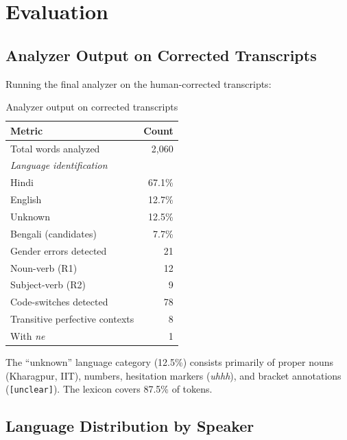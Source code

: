 \documentclass[11pt,a4paper]{report}
\begin{document}
\chapter{Evaluation}
\label{sec:eval}

\section{Analyzer Output on Corrected Transcripts}

Running the final analyzer on the human-corrected transcripts:

\begin{table}[H]
\centering
\caption{Analyzer output on corrected transcripts}
\label{tab:eval}
\begin{tabular}{lr}
\toprule
\textbf{Metric} & \textbf{Count} \\
\midrule
Total words analyzed & 2,060 \\
\midrule
\multicolumn{2}{l}{\textit{Language identification}} \\
\quad Hindi & 67.1\% \\
\quad English & 12.7\% \\
\quad Unknown & 12.5\% \\
\quad Bengali (candidates) & 7.7\% \\
\midrule
Gender errors detected & 21 \\
\quad Noun-verb (R1) & 12 \\
\quad Subject-verb (R2) & 9 \\
\midrule
Code-switches detected & 78 \\
\midrule
Transitive perfective contexts & 8 \\
\quad With \textit{ne} & 1 \\
\bottomrule
\end{tabular}
\end{table}

The ``unknown'' language category (12.5\%) consists primarily of proper nouns (Kharagpur, IIT), numbers, hesitation markers (\textit{uhhh}), and bracket annotations (\texttt{[unclear]}). The lexicon covers 87.5\% of tokens.

\section{Language Distribution by Speaker}
\end{document}
